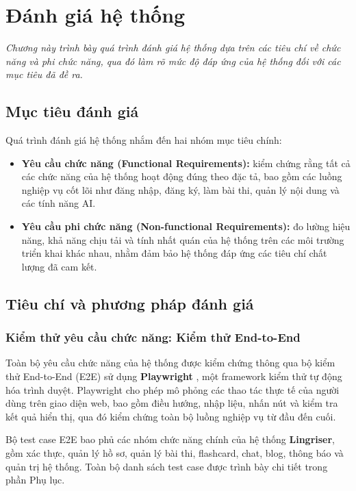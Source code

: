 \chapter{Đánh giá hệ thống}
\textit{Chương này trình bày quá trình đánh giá hệ thống dựa trên các tiêu chí về chức năng và phi chức năng, qua đó làm rõ mức độ đáp ứng của hệ thống đối với các mục tiêu đã đề ra.}

\section{Mục tiêu đánh giá}
Quá trình đánh giá hệ thống nhắm đến hai nhóm mục tiêu chính:

\begin{itemize}
    \item \textbf{Yêu cầu chức năng (Functional Requirements):} kiểm chứng rằng tất cả các chức năng của hệ thống hoạt động đúng theo đặc tả, bao gồm các luồng nghiệp vụ cốt lõi như đăng nhập, đăng ký, làm bài thi, quản lý nội dung và các tính năng AI.
    \item \textbf{Yêu cầu phi chức năng (Non-functional Requirements):} đo lường hiệu năng, khả năng chịu tải và tính nhất quán của hệ thống trên các môi trường triển khai khác nhau, nhằm đảm bảo hệ thống đáp ứng các tiêu chí chất lượng đã cam kết.
\end{itemize}

\section{Tiêu chí và phương pháp đánh giá}

\subsection{Kiểm thử yêu cầu chức năng: Kiểm thử End-to-End}

Toàn bộ yêu cầu chức năng của hệ thống được kiểm chứng thông qua bộ kiểm thử End-to-End (E2E) sử dụng \textbf{Playwright} \cite{playwright_docs}, một framework kiểm thử tự động hóa trình duyệt. Playwright cho phép mô phỏng các thao tác thực tế của người dùng trên giao diện web, bao gồm điều hướng, nhập liệu, nhấn nút và kiểm tra kết quả hiển thị, qua đó kiểm chứng toàn bộ luồng nghiệp vụ từ đầu đến cuối.

Bộ test case E2E bao phủ các nhóm chức năng chính của hệ thống \textbf{Lingriser}, gồm xác thực, quản lý hồ sơ, quản lý bài thi, flashcard, chat, blog, thông báo và quản trị hệ thống. Toàn bộ danh sách test case được trình bày chi tiết trong phần Phụ lục.

